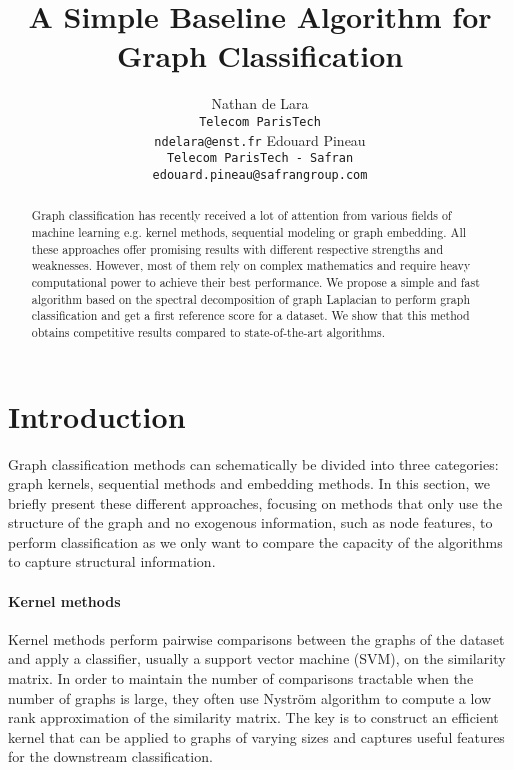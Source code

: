 \documentclass{article}
\title{A Simple Baseline Algorithm for Graph Classification}
\author{
  Nathan de Lara \\
  \texttt{Telecom ParisTech}\\
  \texttt{ndelara@enst.fr}
  \And
  Edouard Pineau \\
  \texttt{Telecom ParisTech - Safran}\\
  \texttt{edouard.pineau@safrangroup.com}
}
\begin{document}
\maketitle

\begin{abstract}
    Graph classification has recently received a lot of attention from various fields of machine learning e.g. kernel methods, sequential modeling or graph embedding. All these approaches offer promising results with different respective strengths and weaknesses. However, most of them rely on complex mathematics and require heavy computational power to achieve their best performance. We propose a simple and fast algorithm based on the spectral decomposition of graph Laplacian to perform graph classification and get a first reference score for a dataset. We show that this method obtains competitive results compared to state-of-the-art algorithms. 
\end{abstract}

\section{Introduction}
\label{sec:introduction}

Graph classification methods can schematically be divided into three categories: graph kernels, sequential methods and embedding methods. In this section, we briefly present these different approaches, focusing on methods that only use the structure of the graph and no exogenous information, such as node features, to perform classification as we only want to compare the capacity of the algorithms to capture structural information.

\paragraph{Kernel methods}
Kernel methods \citep{nikolentzos2017kernel, nikolentzos2017matching, nikolentzos2018degeneracy, neumann2016propagation} perform pairwise comparisons between the graphs of the dataset and apply a classifier, usually a support vector machine (SVM), on the similarity matrix. In order to maintain the number of comparisons tractable when the number of graphs is large, they often use Nyström algorithm \citep{williams2001using} to compute a low rank approximation of the similarity matrix. The key is to construct an efficient kernel that can be applied to graphs of varying sizes and captures useful features for the downstream classification.
\end{document}

